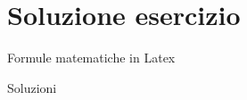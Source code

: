 \section{Soluzione esercizio}
  \begin{frame}{Formule matematiche in Latex}

    \begin{exampleblock}{Soluzioni}
      
    \end{exampleblock}

\end{frame}
